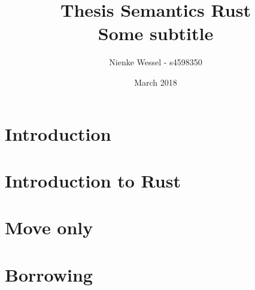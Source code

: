 \documentclass{report}
\title{Thesis Semantics Rust\\ \large Some subtitle}
\author{Nienke Wessel - s4598350 }
\date{March 2018}
\begin{document}
\maketitle

%

\tableofcontents

\chapter*{Introduction}


\chapter{Introduction to Rust}


\chapter{Move only}


\chapter{Borrowing}


%

%

%

%

%
\end{document}
